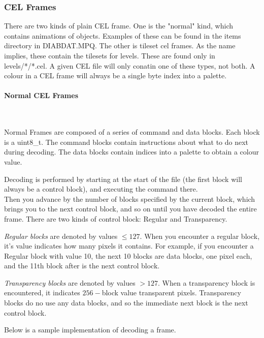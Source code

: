 \documentclass[a4paper]{article}
\newcommand{\subsubsubsection}[1] 
{
	\paragraph{#1}
	\mbox{}\\
	
	\noindent
}
\begin{document}
	
	\subsubsection{CEL Frames}
	There are two kinds of plain CEL frame. One is the "normal" kind, which contains animations of objects. Examples of these can be found in the items directory in DIABDAT.MPQ. The other is tileset cel frames. As the name implies, these contain the tilesets for levels. These are found only in levels/*/*.cel.
	A given CEL file will only conatin one of these types, not both.
A colour in a CEL frame will always be a single byte index into a palette.

	\subsubsubsection{Normal CEL Frames}
	Normal Frames are composed of a series of command and data blocks.
	Each block is a uint8\_t.
	The command blocks contain instructions about what to do next during decoding. The data blocks contain indices into a palette to obtain a colour value.
	
	Decoding is performed by starting at the start of the file (the first block will always be a control block), and executing the command there. 
	\\Then you advance by the number of blocks specified by the current block, which brings you to the next control block, and so on until you have decoded the entire frame. There are two kinds of control block: Regular and Transparency.
	
	\emph{Regular blocks} are denoted by values $\leq 127$. When you encounter a regular block, it's value indicates how many pixels it contains. For example, if you encounter a Regular block with value 10, the next 10 blocks are data blocks, one pixel each, and the 11th block after is the next control block.
	
	\emph{Transparency blocks} are denoted by values $> 127$. When a transparency block is encountered, it indicates $256-$block value transparent pixels. Transparency blocks do no use any data blocks, and so the immediate next block is the next control block.
	
	Below is a sample implementation of decoding a frame.
	
\end{document}
